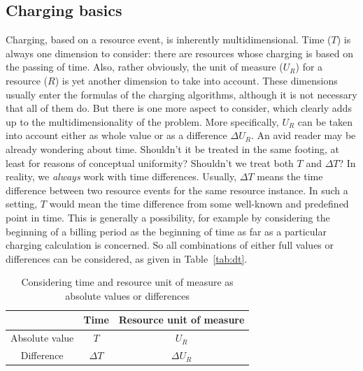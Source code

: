 \documentclass[letterpaper,twocolumn,10pt]{article}
\newcommand{\DTime}{\ensuremath{T}\xspace} %
\newcommand{\DeltaDTime}{\ensuremath{\Delta{T}}\xspace}
\newcommand{\DUnitR}{\ensuremath{U_{R}}\xspace} %
\newcommand{\DeltaDUnitR}{\ensuremath{\Delta U_{R}}\xspace}
\begin{document}
\subsection{Charging basics}

Charging, based on a resource event, is inherently multidimensional.
Time (\DTime) is always one dimension to consider: there are resources
whose charging is based on the passing of time. Also, rather
obviously, the unit of measure (\DUnitR) for a resource ($R$) is yet
another dimension to take into account. These dimensions usually enter
the formulas of the charging algorithms, although it is not necessary
that all of them do. But there is one more aspect to consider, which
clearly adds up to the multidimensionality of the problem. More
specifically, \DUnitR can be taken into account either as whole value
or as a difference \DeltaDUnitR. An avid reader may be already
wondering about time. Shouldn't it be treated in the same footing, at
least for reasons of conceptual uniformity? Shouldn't we treat both
\DTime and \DeltaDTime? In reality, we \textit{always} work with time
differences. Usually, \DeltaDTime means the time difference between
two resource events for the same resource instance. In such a setting,
\DTime would mean the time difference from some well-known and
predefined point in time. This is generally a possibility, for example
by considering the beginning of a billing period as the beginning of
time as far as a particular charging calculation is concerned. So all
combinations of either full values or differences can be considered,
as given in Table~\ref{tab:dt}.

\begin{table}[htdp]
\label{tab:dt}
\begin{center}
\begin{tabular}{|c|c|c|}
\hline
&Time & Resource unit of measure \\
\hline
Absolute value & \DTime & \DUnitR \\
Difference & \DeltaDTime  & \DeltaDUnitR \\
\hline
\end{tabular}
\end{center}
\label{default}
\caption{Considering time and resource unit of measure as absolute values or differences
}
\end{table}%
\end{document}
